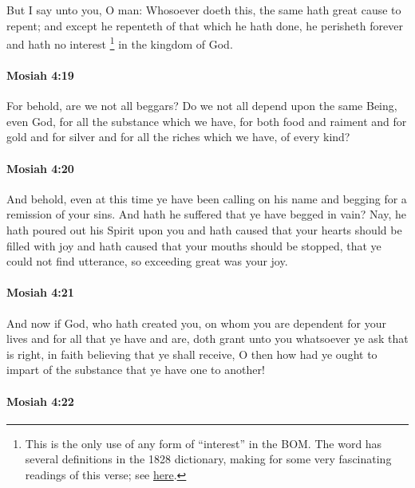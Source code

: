 			But I say unto you, O man:
			Whosoever doeth this, the same hath great cause to repent;
			and except he repenteth of that which he hath done,
			he perisheth forever and hath no interest%
				\footnote{%
					\label{MOSIAH-4-18-NOTE-interest}%
					This is the only use of any form of ``interest'' in the BOM. The word has several definitions in the 1828 dictionary, making for some very fascinating readings of this verse; see \hyperref[INTEREST-1828]{here}.
					}
			in the kingdom of God.

		\paragraph{Mosiah 4:19} %
			\label{MOSIAH-4-19}

			For behold, are we not all beggars?
			Do we not all depend upon the same Being, even God,
			for all the substance which we have,
			for both food and raiment and for gold and for silver
			and for all the riches which we have, of every kind?

		\paragraph{Mosiah 4:20} %
			\label{MOSIAH-4-20}

			And behold, even at this time ye have been calling on his name
			and begging for a remission of your sins.
			And hath he suffered that ye have begged in vain?
			Nay, he hath poured out his Spirit upon you
			and hath caused that your hearts should be filled with joy
			and hath caused that your mouths should be stopped,
			that ye could not find utterance,
			so exceeding great was your joy.

		\paragraph{Mosiah 4:21} %
			\label{MOSIAH-4-21}

			And now if God, who hath created you,
			on whom you are dependent for your lives and for all that ye have and are,
			doth grant unto you whatsoever ye ask that is right,
			in faith believing that ye shall receive,
			O then how had ye ought to impart of the substance that ye have one to another!

		\paragraph{Mosiah 4:22} %
			\label{MOSIAH-4-22}

